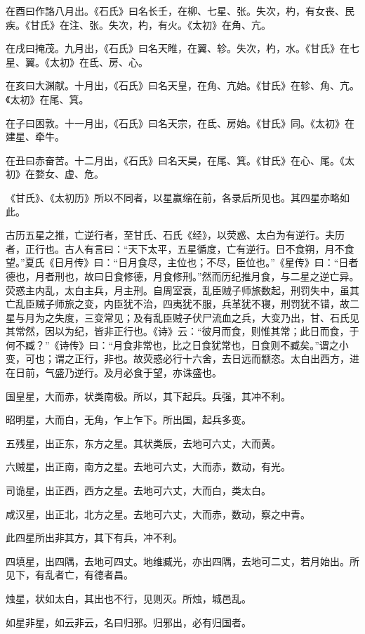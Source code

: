 \documentclass[]{article}
\begin{document}
在酉曰作詻八月出。《石氏》曰名长壬，在柳、七星、张。失次，杓，有女丧、民疾。《甘氏》在注、张。失次，杓，有火。《太初》在角、亢。

在戌曰掩茂。九月出，《石氏》曰名天睢，在翼、轸。失次，杓，水。《甘氏》在七星、翼。《太初》在氐、房、心。

在亥曰大渊献。十月出，《石氏》曰名天皇，在角、亢始。《甘氏》在轸、角、亢。《太初》在尾、箕。

在子曰困敦。十一月出，《石氏》曰名天宗，在氐、房始。《甘氏》同。《太初》在建星、牵牛。

在丑曰赤奋苦。十二月出，《石氏》曰名天昊，在尾、箕。《甘氏》在心、尾。《太初》在婺女、虚、危。

《甘氏》、《太初历》所以不同者，以星赢缩在前，各录后所见也。其四星亦略如此。

古历五星之推，亡逆行者，至甘氏、石氏《经》，以荧惑、太白为有逆行。夫历者，正行也。古人有言曰：``天下太平，五星循度，亡有逆行。日不食朔，月不食望。''夏氏《日月传》曰：``日月食尽，主位也；不尽，臣位也。''《星传》曰：``日者德也，月者刑也，故曰日食修德，月食修刑。''然而历纪推月食，与二星之逆亡异。荧惑主内乱，太白主兵，月主刑。自周室衰，乱臣贼子师旅数起，刑罚失中，虽其亡乱臣贼子师旅之变，内臣犹不治，四夷犹不服，兵革犹不寝，刑罚犹不错，故二星与月为之失度，三变常见；及有乱臣贼子伏尸流血之兵，大变乃出，甘、石氏见其常然，因以为纪，皆非正行也。《诗》云：``彼月而食，则惟其常；此日而食，于何不臧？''《诗传》曰：``月食非常也，比之日食犹常也，日食则不臧矣。''谓之小变，可也；谓之正行，非也。故荧惑必行十六舍，去日远而颛恣。太白出西方，进在日前，气盛乃逆行。及月必食于望，亦诛盛也。

国皇星，大而赤，状类南极。所以，其下起兵。兵强，其冲不利。

昭明星，大而白，无角，乍上乍下。所出国，起兵多变。

五残星，出正东，东方之星。其状类辰，去地可六丈，大而黄。

六贼星，出正南，南方之星。去地可六丈，大而赤，数动，有光。

司诡星，出正西，西方之星。去地可六丈，大而白，类太白。

咸汉星，出正北，北方之星。去地可六丈，大而赤，数动，察之中青。

此四星所出非其方，其下有兵，冲不利。

四填星，出四隅，去地可四丈。地维臧光，亦出四隅，去地可二丈，若月始出。所见下，有乱者亡，有德者昌。

烛星，状如太白，其出也不行，见则灭。所烛，城邑乱。

如星非星，如云非云，名曰归邪。归邪出，必有归国者。
\end{document}
